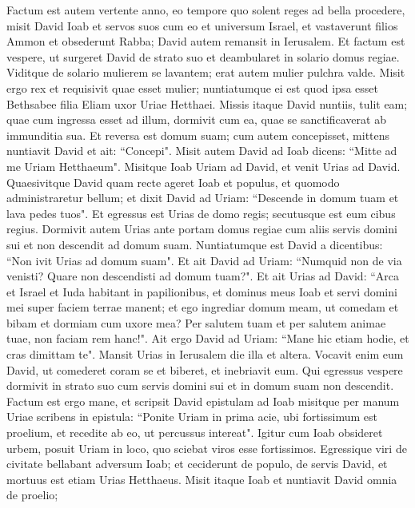 \begin{biblechapter}  
\verse Factum est autem vertente anno, eo tempore quo solent reges ad bella procedere, misit David Ioab et servos suos cum eo et universum Israel, et vastaverunt filios Ammon et obsederunt Rabba; David autem remansit in Ierusalem. 
\verse Et factum est vespere, ut surgeret David de strato suo et deambularet in solario domus regiae. Viditque de solario mulierem se lavantem; erat autem mulier pulchra valde. 
\verse Misit ergo rex et requisivit quae esset mulier; nuntiatumque ei est quod ipsa esset Bethsabee filia Eliam uxor Uriae Hetthaei.  
\verse Missis itaque David nuntiis, tulit eam; quae cum ingressa esset ad illum, dormivit cum ea, quae se sanctificaverat ab immunditia sua. 
\verse Et reversa est domum suam; cum autem concepisset, mittens nuntiavit David et ait: “Concepi". 
\verse Misit autem David ad Ioab dicens: “Mitte ad me Uriam Hetthaeum". Misitque Ioab Uriam ad David, 
\verse et venit Urias ad David. Quaesivitque David quam recte ageret Ioab et populus, et quomodo administraretur bellum; 
\verse et dixit David ad Uriam: “Descende in domum tuam et lava pedes tuos". Et egressus est Urias de domo regis; secutusque est eum cibus regius. 
\verse Dormivit autem Urias ante portam domus regiae cum aliis servis domini sui et non descendit ad domum suam. 
\verse Nuntiatumque est David a dicentibus: “Non ivit Urias ad domum suam". Et ait David ad Uriam: “Numquid non de via venisti? Quare non descendisti ad domum tuam?". 
\verse Et ait Urias ad David: “Arca et Israel et Iuda habitant in papilionibus, et dominus meus Ioab et servi domini mei super faciem terrae manent; et ego ingrediar domum meam, ut comedam et bibam et dormiam cum uxore mea? Per salutem tuam et per salutem animae tuae, non faciam rem hanc!". 
\verse Ait ergo David ad Uriam: “Mane hic etiam hodie, et cras dimittam te". Mansit Urias in Ierusalem die illa et altera. 
\verse Vocavit enim eum David, ut comederet coram se et biberet, et inebriavit eum. Qui egressus vespere dormivit in strato suo cum servis domini sui et in domum suam non descendit. 
\verse Factum est ergo mane, et scripsit David epistulam ad Ioab misitque per manum Uriae 
\verse scribens in epistula: “Ponite Uriam in prima acie, ubi fortissimum est proelium, et recedite ab eo, ut percussus intereat". 
\verse Igitur cum Ioab obsideret urbem, posuit Uriam in loco, quo sciebat viros esse fortissimos.  
\verse Egressique viri de civitate bellabant adversum Ioab; et ceciderunt de populo, de servis David, et mortuus est etiam Urias Hetthaeus. 
\verse Misit itaque Ioab et nuntiavit David omnia de proelio; 

\end{biblechapter}
